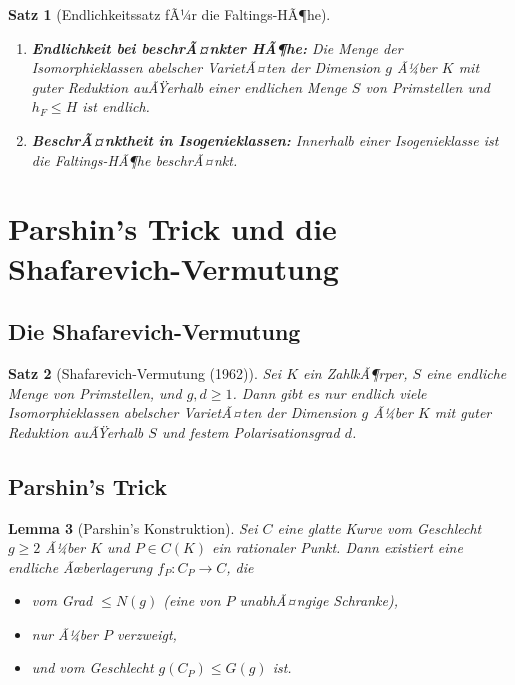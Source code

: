 ﻿\documentclass[12pt,a4paper]{article}
\theoremstyle{plain}
\newtheorem{theorem}{Satz}[section]
\newtheorem{lemma}[theorem]{Lemma}
\theoremstyle{definition}
\theoremstyle{remark}
\begin{document}
\begin{theorem}[Endlichkeitssatz fÃ¼r die Faltings-HÃ¶he]\label{thm:faltings_endlich}
\begin{enumerate}[leftmargin=2em]
  \item[(i)] \textbf{Endlichkeit bei beschrÃ¤nkter HÃ¶he:}
    Die Menge der Isomorphieklassen abelscher VarietÃ¤ten der Dimension $g$
    Ã¼ber $K$ mit guter Reduktion auÃŸerhalb einer endlichen Menge $S$
    von Primstellen und $h_F \leq H$ ist endlich.
  \item[(ii)] \textbf{BeschrÃ¤nktheit in Isogenieklassen:}
    Innerhalb einer Isogenieklasse ist die Faltings-HÃ¶he beschrÃ¤nkt.
\end{enumerate}
\end{theorem}

\section{Parshin's Trick und die Shafarevich-Vermutung}

\subsection{Die Shafarevich-Vermutung}

\begin{theorem}[Shafarevich-Vermutung (1962)]\label{thm:shafarevich}
Sei $K$ ein ZahlkÃ¶rper, $S$ eine endliche Menge von Primstellen, und $g, d \geq 1$.
Dann gibt es nur endlich viele Isomorphieklassen abelscher VarietÃ¤ten der Dimension $g$
Ã¼ber $K$ mit guter Reduktion auÃŸerhalb $S$ und festem Polarisationsgrad $d$.
\end{theorem}

\subsection{Parshin's Trick}

\begin{lemma}[Parshin's Konstruktion]\label{lem:parshin}
Sei $C$ eine glatte Kurve vom Geschlecht $g \geq 2$ Ã¼ber $K$ und $P \in C(K)$ ein rationaler Punkt.
Dann existiert eine endliche Ãœberlagerung $f_P: C_P \to C$, die
\begin{itemize}
  \item vom Grad $\leq N(g)$ (eine von $P$ unabhÃ¤ngige Schranke),
  \item nur Ã¼ber $P$ verzweigt,
  \item und vom Geschlecht $g(C_P) \leq G(g)$ ist.
\end{itemize}
\end{lemma}
\end{document}
